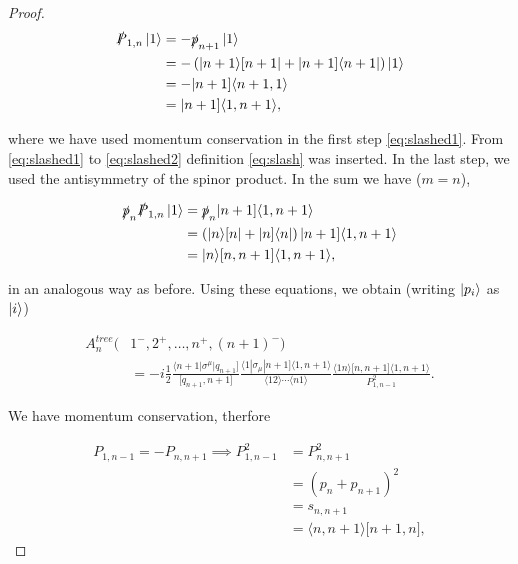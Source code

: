 \documentclass{article}
\theoremstyle{definition}
\numberwithin{equation}{section}
\begin{document}
\begin{proof}
\begin{align}
    \slashed{P}_{1,n} \ket{1} &= - \slashed{p}_{n+1} \ket{1} \label{eq:slashed1} \\
    &= - \left( | n+1 \rangle \lbrack n+1 | + | n+1 \rbrack \langle n+1 | \right) \ket{1} \label{eq:slashed2} \\
    &= - | n+1 \rbrack \langle n+1,1 \rangle \label{eq:slashed3} \\
    &= | n+1 \rbrack \langle 1,n+1 \rangle, \label{eq:slashed4}
\end{align}

where we have used momentum conservation in the first step \eqref{eq:slashed1}. From \eqref{eq:slashed1} to \eqref{eq:slashed2} definition \eqref{eq:slash} was inserted. In the last step, we used the antisymmetry of the spinor product. In the sum we have ($m=n$),

\begin{align}
    \slashed{p}_n \slashed{P}_{1,n} \ket{1} &= \slashed{p}_n | n+1 \rbrack \langle 1,n+1 \rangle \\
    &= \left( | n \rangle \lbrack n | + | n \rbrack \langle n | \right) | n+1 \rbrack \langle 1,n+1 \rangle \\
    &= | n \rangle \lbrack n,n+1 \rbrack \langle 1,n+1 \rangle,
\end{align}

in an analogous way as before. Using these equations, we obtain (writing $\ket{p_i}$ as $\ket{i}$)

\begin{align}
    A_n^{tree}(&1^{-}, 2^{+}, \dots , n^{+}, (n+1)^{-}) \\
    &= -i \frac{1}{2} \frac{\langle n+1 | \sigma^{\mu} | q_{n+1} \rbrack }{\lbrack q_{n+1},n+1 \rbrack } \frac{ \langle 1 | \sigma_{\mu} | n+1 \rbrack \langle 1,n+1 \rangle }{ \langle 12 \rangle \cdots \langle n1 \rangle} \frac{ \langle 1n \rangle \lbrack n,n+1 \rbrack \langle 1,n+1 \rangle }{ P_{1,n-1}^2 } \label{eq:A_n_tree}.
\end{align}

We have momentum conservation, therfore

\begin{align}
    P_{1,n-1} = - P_{n,n+1} \implies P_{1,n-1}^2 &= P_{n,n+1}^2 \\
    &= \left( p_n + p_{n+1} \right)^2 \\
    &= s_{n,n+1} \\
    &= \langle n,n+1 \rangle \lbrack n+1,n \rbrack,
\end{align}


\end{proof}
\end{document}
